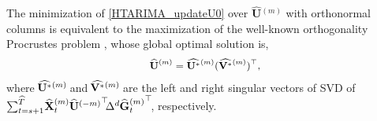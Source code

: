 \documentclass[letterpaper]{article} %
\numberwithin{theorem}{section}
\begin{document}
The minimization of \eqref{HTARIMA_updateU0} over  $\widehat{ \mathbf U}{^{(m)}}$  with orthonormal columns is equivalent to the maximization of the well-known
orthogonality  Procrustes problem \cite{higham1995matrix}, whose global optimal solution is,
\begin{equation} \label{HTARIMA_UpdateU}
\small 
\begin{aligned}
\widehat{ \mathbf U}{^{(m)}}   = \widehat{ \mathbf U^*}{^{(m)}} (\widehat{ \mathbf V^*}{^{(m)}}  )^\top,
\end{aligned} 
\end{equation} 
where $\hspace{-0.05cm}\widehat{ \mathbf U^*}{^{(m)}}\hspace{-0.05cm}$ and $ \hspace{-0.05cm}\widehat{ \mathbf V^*}{^{(m)}}  \hspace{-0.05cm}$
are the left and right singular vectors
of SVD of $ \scriptsize \hspace{-0.01cm}\sum_{t=s+1}^{\widehat{T}}  \hspace{-0.05cm} {\widehat{\mathbf{X}}^{(m)}_{t}}  \hspace{-0.01cm}    \widehat{ \mathbf U}{^{(-m)}}^\top \hspace{-0.1cm} \Delta^d  \hspace{-0.01cm} {\widehat{\mathbf{G}}{^{(m)}_{t}}}^\top \hspace{-0.05cm}$, respectively. 
\end{document}
